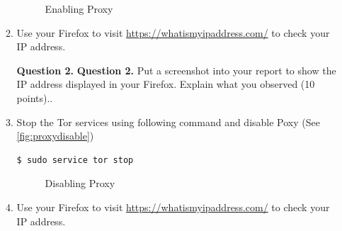 \documentclass[11pt]{article}
\newcommand{\tor}{{\sf Tor}\xspace}
\begin{document}
\begin{enumerate}
\begin{enumerate}
\begin{figure}[h]
\centering
{}
\caption{Enabling Proxy}\label{fig:proxyenable}
\end{figure}

\item Use your \textsf{Firefox} to visit \url{https://whatismyipaddress.com/} to check your IP address.  

\textbf{Question 2.} \textbf{Question 2.}  Put a screenshot into your report to show the IP address displayed in your \textsf{Firefox}. Explain what you observed (10 points)..

\item Stop the \tor services using following command and disable Poxy (See \autoref{fig:proxydisable})
 \begin{lstlisting}
$ sudo service tor stop
\end{lstlisting}\vspace{-6mm}

\begin{figure}[h]
\centering
{}
\caption{Disabling Proxy}\label{fig:proxydisable}
\end{figure}

\item Use your \textsf{Firefox} to visit \url{https://whatismyipaddress.com/} to check your IP address.


\end{enumerate}
\end{enumerate}
\end{document}
